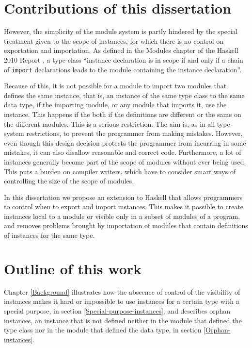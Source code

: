 \documentclass[msc]{ppgccufmg}
\begin{document}
\section{Contributions of this dissertation}

However, the simplicity of the module system is partly hindered by the special treatment given to the scope of instances, for which there is no control on exportation and importation.
As defined in the Modules chapter of the Haskell 2010 Report \citep[section~5.4]{report}, a type class ``instance declaration is in scope if and only if a chain of \texttt{import} declarations leads to the module containing the instance declaration''.

Because of this, it is not possible for a module to import two modules that defines the same instance, that is, an instance of the same type class to the same data type, if the importing module, or any module that imports it, use the instance.  This happens if the both if the definitions are different or the same on the different modules.  This is a
serious
restriction. The aim is, as in all type system restrictions, to
prevent the programmer from making mistakes.  However, even though
this design decision protects the programmer from incurring in some
mistakes, it can also disallow reasonable and correct code.
Furthermore, a lot of instances generally become part of the scope of
modules without ever being used.  This puts a burden on compiler
writers, which have to consider smart ways of controlling the size of
the scope of modules.

In this dissertation we propose an extension to Haskell that
allows programmers to control when to export and import instances.
This makes it possible to create instances local to a module or
visible only in a subset of modules of a program, and removes problems
brought by importation of modules that contain definitions of
instances for the same type.

\section{Outline of this work}
Chapter \ref{Background} illustrates how the abscence of control of the visibility of instances makes it hard or impossible to use instances for a certain type with a special purpose, in section \ref{Special-purpose-instances}; and describes orphan instances, an instance that is not defined neither in the module that defined the type class nor in the module that defined the data type, in section \ref{Orphan-instances}.
\end{document}

